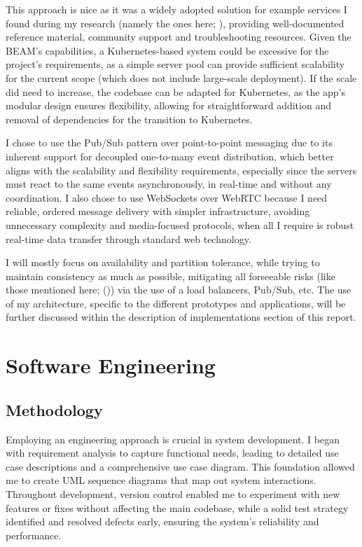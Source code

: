 \documentclass[]{final}
\begin{document}
This approach is nice as it was a widely adopted solution for example
services I found during my research (namely the ones here; \cite{frost_making_2023, franchetti_coping_2020}), providing
well-documented reference material, community support and troubleshooting
resources.
Given the BEAM's capabilities, a Kubernetes-based system could be excessive
for the project’s requirements, as a simple server pool can provide
sufficient scalability for the current scope (which does not include
large-scale deployment). If the scale did need to increase, the
codebase can be adapted for Kubernetes, as the app’s modular design
ensures flexibility, allowing for straightforward addition and removal of
dependencies for the transition to Kubernetes.

I chose to use the Pub/Sub pattern over point-to-point messaging due to
its inherent support for decoupled one-to-many event distribution, which
better aligns with the scalability and flexibility requirements,
especially since the servers must react to the same events asynchronously,
in real-time and without any coordination. I also chose to use WebSockets over
WebRTC because I need reliable, ordered message
delivery with simpler infrastructure, avoiding unnecessary complexity and
media-focused protocols, when all I require is robust real-time data
transfer through standard web technology.

I will mostly focus on availability and partition tolerance, while trying to
maintain consistency as much as possible,
mitigating all forseeable risks (like those mentioned here; {\hypersetup{linkcolor=teal}(\pageref{rationale_problem})}) via the use of
a load balancers, Pub/Sub, etc. The use of my architecture, specific to
the different prototypes and applications, will be further discussed within the
description of implementations section of this report.

\chapter{Software Engineering}

\section{Methodology}
Employing an engineering approach is crucial in system development. I began with
requirement analysis to capture functional needs, leading to detailed use case
descriptions and a comprehensive use case diagram. This foundation allowed me to
create UML sequence diagrams that map out system interactions. Throughout development,
version control enabled me to experiment with new features or fixes without
affecting the main codebase, while a solid test strategy identified and resolved
defects early, ensuring the system's reliability and performance.
\end{document}
